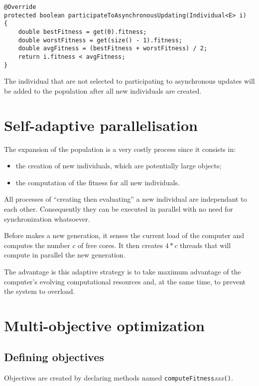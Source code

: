 \documentclass{article}
\begin{document}
\begin{lstlisting}
@Override
protected boolean participateToAsynchronousUpdating(Individual<E> i)
{
	double bestFitness = get(0).fitness;
	double worstFitness = get(size() - 1).fitness;
	double avgFitness = (bestFitness + worstFitness) / 2;
	return i.fitness < avgFitness;
}
\end{lstlisting}

The individual that are not selected to participating to asynchronous updates
will be added to the population after all new individuals are created.

\section{Self-adaptive parallelisation}
The expansion of the population is a very costly process since it
consists in:
\begin{itemize}
  \item the creation of new individuals, which are potentially large objects;
  \item the computation of the
fitness for all new individuals.
\end{itemize}

All processes of ``creating then evaluating'' a new individual are independant
to each other. Consequently they can be executed in parallel with no need for
synchronization whatsoever.

Before \drwin makes a new generation, it senses the current load of the
computer and computes the number $c$ of free cores. It then creates $4 * c$
threads that will compute in parallel the new generation.

The advantage  is this adaptive strategy is to take maximum advantage of
the computer's evolving computational resources and, at the same time, to
prevent the system to overload.





\section{Multi-objective optimization}


\subsection{Defining objectives}

Objectives are created by declaring methods named
\texttt{computeFitness}\textit{xxx}\texttt{()}.
\end{document}
